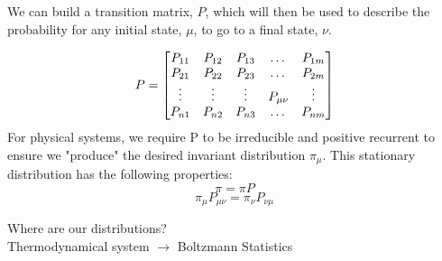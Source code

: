 \documentclass[11pt,notes]{beamer}
\begin{document}
\begin{frame}
We can build a transition matrix, $P$, which will then be used to describe the probability for any initial state, $\mu$, to go to a final state, $\nu$. 

\[
P = 
\begin{bmatrix}
	P_{11} & P_{12} & P_{13} &    \dots    & P_{1m} \\
	P_{21} & P_{22} & P_{23} &    \dots    & P_{2m} \\
	\vdots & \vdots & \vdots & P_{\mu \nu} & \vdots \\
	P_{n1} & P_{n2} & P_{n3} &    \dots    & P_{nm}
\end{bmatrix}\vspace{.25cm}\]
For physical systems, we require P to be irreducible and positive recurrent to ensure we "produce" the desired invariant distribution $\pi_\mu$. This stationary distribution has the following properties:
\begin{equation}
\pi = \pi P
\end{equation}
\begin{equation}
\pi_\mu P_{\mu\nu}= \pi_\nu P_{\nu\mu}
\end{equation}
\begin{center}
	Where are our distributions?\\
	Thermodynamical system $ \rightarrow $ Boltzmann Statistics
\end{center}


\end{frame}
\end{document}
